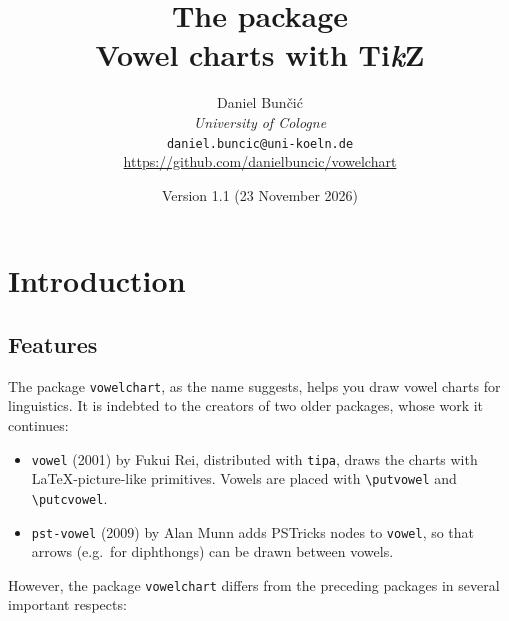 \documentclass[a4paper,11pt]{article}
\title{The \pkg{vowelchart} package\\[2pt]\large Vowel charts with Ti\textit{k}Z}
\author{Daniel Bunčić \\ \textit{University of Cologne} \\ \texttt{daniel.buncic@uni-koeln.de}\\
  \url{https://github.com/danielbuncic/vowelchart}}
\date{Version 1.1 (23 November 2026)}
\newcommand\cmd[1]{\texttt{\textbackslash #1}}
\newcommand\pkg[1]{\texttt{#1}}
\begin{document}
\maketitle
\setlength{\cftbeforesecskip}{3pt}
\setlength{\cftbeforesubsecskip}{0pt}
{\small\tableofcontents}
\newpage




\section{Introduction}

\subsection{Features}

The package \pkg{vowelchart}, as the name suggests, helps you draw vowel charts for linguistics. It is indebted to the creators of two older packages, whose work it continues:

\begin{itemize}
	\item
	\pkg{vowel} (2001) by Fukui Rei, distributed with \pkg{tipa}, draws the charts with \LaTeX\relax-picture-like primitives. Vowels are placed with \cmd{putvowel} and \cmd{putcvowel}.
	\item
	\pkg{pst-vowel} (2009) by Alan Munn adds PSTricks nodes to \pkg{vowel}, so that arrows (e.g.\ for diphthongs) can be drawn between vowels.
\end{itemize}

\noindent
However, the package \pkg{vowelchart} differs from the preceding packages in several important respects:
\end{document}
